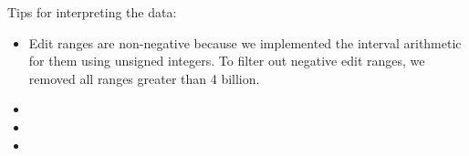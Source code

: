 \documentclass[english,submission,cleveref]{programming}
\begin{document}
Tips for interpreting the data:

\begin{itemize}
  \item
    Edit ranges are non-negative because we
    implemented the interval arithmetic for them using unsigned integers.
    To filter out negative edit ranges, we removed all ranges
    greater than 4 billion.

  \item
  \item
  \item
\end{itemize}

\newpage


\end{document}
